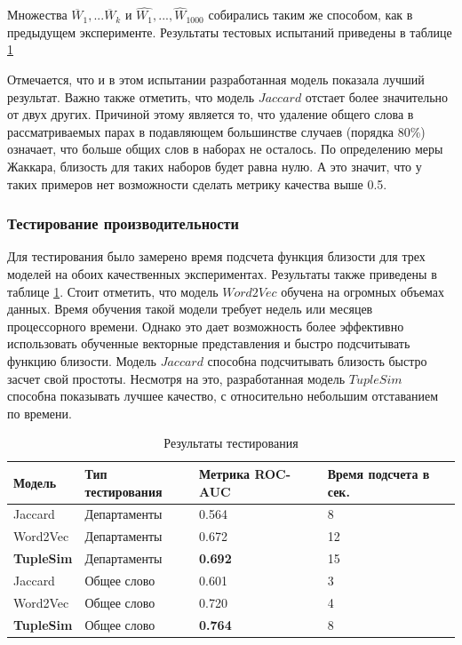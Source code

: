 Множества $\overline{W}_{1}, ... \overline{W}_{k}$ и $\hat{W_1}, ..., \hat{W}_{1000}$ собирались таким же способом, как в предыдущем эксперименте. Результаты тестовых испытаний приведены в таблице \ref{tbl:tuple_test}

Отмечается, что и в этом испытании разработанная модель показала лучший результат. Важно также отметить, что модель $Jaccard$ отстает более значительно от двух других. Причиной этому является то, что удаление общего слова в рассматриваемых парах в подавляющем большинстве случаев (порядка 80\%) означает, что больше общих слов в наборах не осталось. По определению меры Жаккара, близость для таких наборов будет равна нулю. А это значит, что у таких примеров нет возможности сделать метрику качества выше 0.5.

\subsubsection{Тестирование производительности}
Для тестирования было замерено время подсчета функция близости для трех моделей на обоих качественных экспериментах. Результаты также приведены в таблице \ref{tbl:tuple_test}. Стоит отметить, что модель $Word2Vec$ обучена на огромных объемах данных. Время обучения такой модели требует недель или месяцев процессорного времени. Однако это дает возможность более эффективно использовать обученные векторные представления и быстро подсчитывать функцию близости. Модель $Jaccard$ способна подсчитывать близость быстро засчет свой простоты. Несмотря на это, разработанная модель $TupleSim$ способна показывать лучшее качество, с относительно небольшим отставанием по времени.

\begin{table}
\begin{tabularx}{16cm}{|X|X|X|X|} 
        \hline
        Модель & Тип тестирования & Метрика ROC-AUC &  Время подсчета в сек. \\ \hline
        Jaccard & Департаменты &0.564 & 8 \\ \hline
        Word2Vec & Департаменты &0.672 & 12 \\ \hline
        \textbf{TupleSim} & Департаменты & \textbf{0.692} & 15 \\ \hline
        Jaccard & Общее слово & 0.601 & 3 \\ \hline
        Word2Vec & Общее слово & 0.720 & 4 \\ \hline
        \textbf{TupleSim} & Общее слово& \textbf{0.764} & 8 \\ \hline
\end{tabularx}

\caption{Результаты тестирования} \label{tbl:tuple_test}
\end{table}




